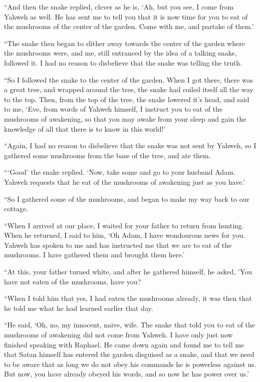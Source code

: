 \documentclass[12pt,twoside,titlepage]{report}
\begin{document}
``And then the snake replied, clever as he is, `Ah, but you see, I come
from Yahweh as well. He has sent me to tell you that it is now time for
you to eat of the mushrooms of the center of the garden. Come with me,
and partake of them.'

``The snake then began to slither away towards the center of the garden
where the mushrooms were, and me, still entranced by the idea of a
talking snake, followed it. I had no reason to disbelieve that the snake
was telling the truth.

``So I followed the snake to the center of the garden. When I got there,
there was a great tree, and wrapped around the tree, the snake had
coiled itself all the way to the top. Then, from the top of the tree,
the snake lowered it's head, and said to me, `Eve, from words of Yahweh
himself, I instruct you to eat of the mushrooms of awakening, so that
you may awake from your sleep and gain the knowledge of all that there
is to know in this world!'

``Again, I had no reason to disbelieve that the snake was not sent by
Yahweh, so I gathered some mushrooms from the base of the tree, and ate
them.

```Good' the snake replied. `Now, take some and go to your husband Adam.
Yahweh requests that he eat of the mushrooms of awakening just as you
have.'

``So I gathered some of the mushrooms, and began to make my way back to
our cottage.

``When I arrived at our place, I waited for your father to return from
hunting. When he returned, I said to him, `Oh Adam, I have wondourous
news for you. Yahweh has spoken to me and has instructed me that we are
to eat of the mushrooms. I have gathered them and brought them here.'

``At this, your father turned white, and after he gathered himself, he
asked, 'You have not eaten of the mushrooms, have you?

``When I told him that yes, I had eaten the mushrooms already, it was
then that he told me what he had learned earlier that day.

``He said, `Oh, no, my innocent, naive, wife. The snake that told you to
eat of the mushrooms of awakening did not come from Yahweh. I have only
just now finished speaking with Raphael. He came down again and found me
to tell me that Satan himself has entered the garden disguised as a
snake, and that we need to be aware that as long we do not obey his
commands he is powerless against us. But now, you have already obeyed
his words, and so now he has power over us.'
\end{document}
